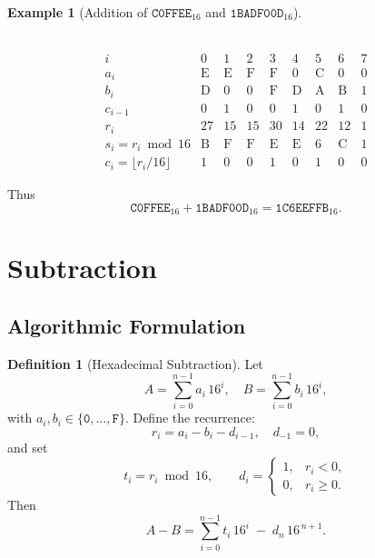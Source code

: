 \documentclass[11pt,a4paper]{article}
\theoremstyle{definition}
\newtheorem{definition}{Definition}[section]
\newtheorem{example}{Example}[section]
\theoremstyle{remark}
\begin{document}
\begin{example}[Addition of $\texttt{C0FFEE}_{16}$ and $\texttt{1BADF00D}_{16}$]
\begin{center}
\begin{minipage}{.475\textwidth}
{\begin{tabular}{|l|l|l|l|l|l|c|c|c|}
	\end{tabular}}
	\end{minipage}\hfill
	\begin{minipage}{.475\textwidth} \[
	\begin{array}{c|cccccccc}
		i & 0 & 1 & 2 & 3 & 4 & 5 & 6 & 7 \\ \hline
		a_i & \mathrm{E} & \mathrm{E} & \mathrm{F} & \mathrm{F} & 0 & \mathrm{C} & 0 & 0 \\
		b_i & \mathrm{D} & 0 & 0 & \mathrm{F} & \mathrm{D} & \mathrm{A} & \mathrm{B} & 1 \\
		c_{i-1} & 0 & 1 & 0 & 0 & 1 & 0 & 1 & 0 \\
		r_i & 27 & 15 & 15 & 30 & 14 & 22 & 12 & 1 \\
		s_i = r_i \bmod 16 & \mathrm{B} & \mathrm{F} & \mathrm{F} & \mathrm{E} & \mathrm{E} & 6 & \mathrm{C} & 1 \\
		c_i = \lfloor r_i/16\rfloor & 1 & 0 & 0 & 1 & 0 & 1 & 0 & 0
		\end{array}\]
	\end{minipage}
	\end{center}
	Thus \[
	\texttt{C0FFEE}_{16} + \texttt{1BADF00D}_{16} = \texttt{1C6EEFFB}_{16}.
	\]
\end{example}

\section{Subtraction}
\subsection{Algorithmic Formulation}
\begin{definition}[Hexadecimal Subtraction]
	Let \[
	A=\sum_{i=0}^{n-1} a_i\,16^i,\quad B=\sum_{i=0}^{n-1} b_i\,16^i,
	\] with $a_i,b_i\in\{\texttt{0},\dots,\texttt{F}\}$.  Define the recurrence: \[
	r_i = a_i - b_i - d_{i-1},\quad d_{-1}=0,
	\] and set \[
	t_i = r _i \bmod 16,\qquad
	d_i = 
	\begin{cases}
		1, & r_i < 0,\\
		0, & r_i \ge 0.
	\end{cases}\]
	Then \[
	A - B = \sum_{i=0}^{n-1} t_i\,16^i \;-\; d_n\,16^{\,n+1}.
	\]
\end{definition}
\end{document}
